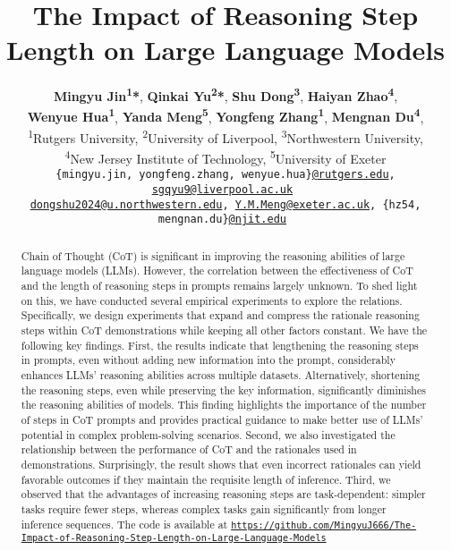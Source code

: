 \documentclass[11pt]{article}
\title{The Impact of Reasoning Step Length on Large Language Models}
\author{
 \textbf{Mingyu Jin\textsuperscript{1}*},
 \textbf{Qinkai Yu\textsuperscript{2}*},
 \textbf{Shu Dong\textsuperscript{3}},
 \textbf{Haiyan Zhao\textsuperscript{4}},
\\
 \textbf{Wenyue Hua\textsuperscript{1}},
 \textbf{Yanda Meng\textsuperscript{5}},
 \textbf{Yongfeng Zhang\textsuperscript{1}},
 \textbf{Mengnan Du\textsuperscript{4}},
\\
 \textsuperscript{1}Rutgers University,
 \textsuperscript{2}University of Liverpool,
 \textsuperscript{3}Northwestern University,\\
 \textsuperscript{4}New Jersey Institute of Technology,
 \textsuperscript{5}University of Exeter
\\
 \small{
 \texttt{\{mingyu.jin, yongfeng.zhang, wenyue.hua\}\href{mailto:@rutgers.edu}{@rutgers.edu}, \href{mailto:sgqyu9@liverpool.ac.uk}{sgqyu9@liverpool.ac.uk}
 }}
 \\
 \small\texttt{{\href{mailto:dongshu2024@u.northwestern.edu}{dongshu2024@u.northwestern.edu}, \href{mailto:Y.M.Meng@exeter.ac.uk}{Y.M.Meng@exeter.ac.uk},
 \{hz54, mengnan.du\}\href{mailto:@njit.edu}{@njit.edu}
 }}
}
\begin{document}
\maketitle
\begin{abstract}
Chain of Thought (CoT) is significant in improving the reasoning abilities of large language models (LLMs). However, the correlation between the effectiveness of CoT and the length of reasoning steps in prompts remains largely unknown. To shed light on this, we have conducted several empirical experiments to explore the relations. Specifically, we design experiments that expand and compress the rationale reasoning steps within CoT demonstrations while keeping all other factors constant. We have the following key findings. First, the results indicate that lengthening the reasoning steps in prompts, even without adding new information into the prompt, considerably enhances LLMs' reasoning abilities across multiple datasets. Alternatively, shortening the reasoning steps, even while preserving the key information, significantly diminishes the reasoning abilities of models. This finding highlights the importance of the number of steps in CoT prompts and provides practical guidance to make better use of LLMs' potential in complex problem-solving scenarios. Second, we also investigated the relationship between the performance of CoT and the rationales used in demonstrations. Surprisingly, the result shows that even incorrect rationales can yield favorable outcomes if they maintain the requisite length of inference. Third, we observed that the advantages of increasing reasoning steps are task-dependent: simpler tasks require fewer steps, whereas complex tasks gain significantly from longer inference sequences. The code is available at
\href{https://github.com/MingyuJ666/The-Impact-of-Reasoning-Step-Length-on-Large-Language-Models}{%
    \nolinkurl{https://github.com/MingyuJ666/The-Impact-of-Reasoning-Step-Length-on-Large-Language-Models}
}

\end{abstract}
%
\end{document}
